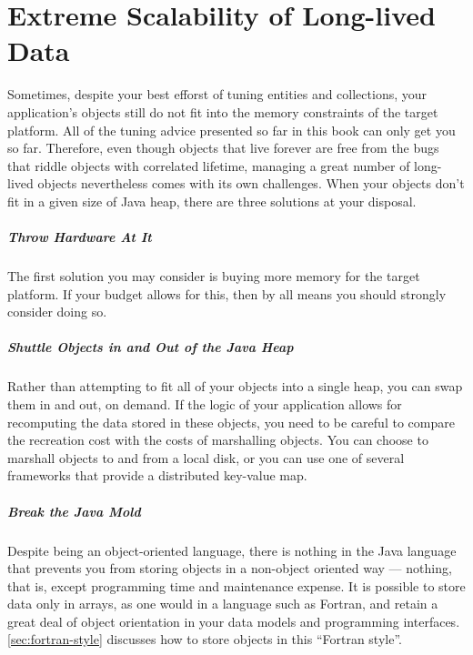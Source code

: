 
\chapter{Extreme Scalability of Long-lived Data}
\label{chapter:large-long-lived}

Sometimes, despite your best efforst of tuning entities and collections, your
application's objects still do not fit into the memory constraints of the target
platform. All of the tuning advice presented so far in this book can only get you
so far. Therefore, even though objects that live forever are free from the bugs
that riddle objects with correlated lifetime, managing a great number of
long-lived objects nevertheless comes with its own challenges. When your objects
don't fit in a given size of Java heap, there are three solutions at your
disposal. 

\paragraph{Throw Hardware At It} The first solution you may consider is buying
more memory for the target platform. If your budget allows for this, then by
all means you should strongly consider doing so.

\paragraph{Shuttle Objects in and Out of the Java Heap} Rather than attempting to
fit all of your objects into a single heap, you can swap them in and out, on
demand. If the logic of your application allows for recomputing the data stored
in these objects, you need to be careful to compare the recreation cost with the
costs of marshalling objects. You can choose to marshall objects to and from a
local disk, or you can use one of several frameworks that provide a distributed
key-value map.

\paragraph{Break the Java Mold} Despite being an object-oriented language, there
is nothing in the Java language that prevents you from storing objects in a
non-object oriented way --- nothing, that is, except programming time and
maintenance expense. It is possible to store data only in arrays, as one would in
a language such as Fortran, and retain a great deal of object orientation in your
data models and programming interfaces. \autoref{sec:fortran-style} discusses how
to store objects in this ``Fortran style''.

